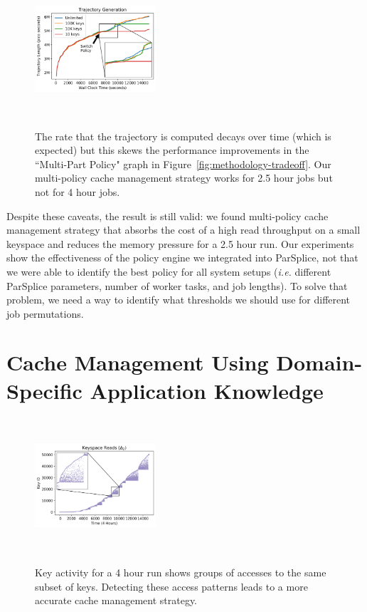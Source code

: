 \begin{figure}[t]
  \noindent\includegraphics[height=5cm,width=0.4\textwidth]{figures/methodology-trajectory.png}\\
  \caption{The rate that the trajectory is computed decays over time (which is
  expected) but this skews the performance improvements in the ``Multi-Part Policy" graph in 
  Figure~\ref{fig:methodology-tradeoff}. Our multi-policy cache management strategy works for 2.5
  hour jobs but not for 4 hour jobs.  \label{fig:methodology-trajectory}}
\end{figure}

Despite these caveats, the result is still valid: we found multi-policy cache 
management strategy that absorbs the cost of a high read throughput on a small
keyspace and reduces the memory pressure for a 2.5 hour run. Our experiments
show the effectiveness of the policy engine we integrated into
ParSplice, not that we were able to identify the best policy for all system
setups ({\it i.e.} different ParSplice parameters, number of worker tasks, and
job lengths).  To solve that problem, we need a way to identify what thresholds
we should use for different job permutations.

\section{Cache Management Using Domain-Specific Application Knowledge}
\label{sec:dom-specific}
\begin{figure}[t]
  \noindent\includegraphics[height=5cm,width=0.4\textwidth]{figures/keyspace-zoomed.png}\\

  \caption{Key activity for a 4 hour run shows groups of accesses to the same
  subset of keys. Detecting these access patterns leads to a more accurate cache
  management strategy.\label{fig:keyspace-zoomed}}

\end{figure}


